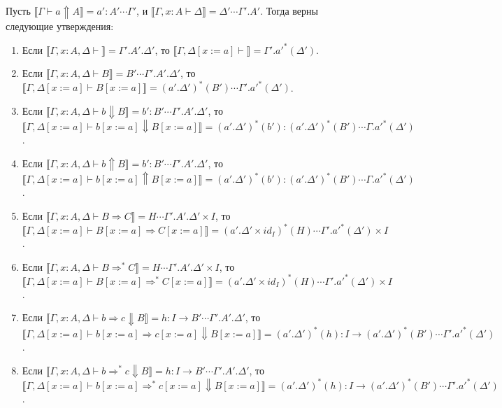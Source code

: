 \documentclass{amsart}
\theoremstyle{definition}
\theoremstyle{remark}
\newcommand{\red}{\Rightarrow}
\renewcommand{\ll}{\llbracket}
\newcommand{\rr}{\rrbracket}
\numberwithin{figure}{section}
\begin{document}
\begin{lem}
Пусть $\ll \Gamma \vdash a \Uparrow A \rr = a' : A' \dotsb \Gamma'$, и $\ll \Gamma, x : A \vdash \Delta \rr = \Delta' \dotsb \Gamma'.A'$.
Тогда верны следующие утверждения:
\begin{enumerate}
\item Если $\ll \Gamma, x : A, \Delta \vdash \rr = \Gamma'.A'.\Delta'$, то $\ll \Gamma, \Delta[x := a] \vdash \rr = \Gamma'.a'^*(\Delta')$.
\item Если $\ll \Gamma, x : A, \Delta \vdash B \rr = B' \dotsb \Gamma'.A'.\Delta'$, то $\ll \Gamma, \Delta[x := a] \vdash B[x := a] \rr = (a'.\Delta')^*(B') \dotsb \Gamma'.a'^*(\Delta')$.
\item Если $\ll \Gamma, x : A, \Delta \vdash b \Downarrow B \rr = b' : B' \dotsb \Gamma'.A'.\Delta'$, то $\ll \Gamma, \Delta[x := a] \vdash b[x := a] \Downarrow B[x := a] \rr = (a'.\Delta')^*(b') : (a'.\Delta')^*(B') \dotsb \Gamma.a'^*(\Delta')$.
\item Если $\ll \Gamma, x : A, \Delta \vdash b \Uparrow B \rr = b' : B' \dotsb \Gamma'.A'.\Delta'$, то $\ll \Gamma, \Delta[x := a] \vdash b[x := a] \Uparrow B[x := a] \rr = (a'.\Delta')^*(b') : (a'.\Delta')^*(B') \dotsb \Gamma.a'^*(\Delta')$.
\item Если $\ll \Gamma, x : A, \Delta \vdash B \red C \rr = H \dotsb \Gamma'.A'.\Delta' \times I$, то $\ll \Gamma, \Delta[x := a] \vdash B[x := a] \red C[x := a] \rr = (a'.\Delta' \times id_I)^*(H) \dotsb \Gamma'.a'^*(\Delta') \times I$.
\item Если $\ll \Gamma, x : A, \Delta \vdash B \red^* C \rr = H \dotsb \Gamma'.A'.\Delta' \times I$, то $\ll \Gamma, \Delta[x := a] \vdash B[x := a] \red^* C[x := a] \rr = (a'.\Delta' \times id_I)^*(H) \dotsb \Gamma'.a'^*(\Delta') \times I$.
\item Если $\ll \Gamma, x : A, \Delta \vdash b \red c \Downarrow B \rr = h : I \to B' \dotsb \Gamma'.A'.\Delta'$, то $\ll \Gamma, \Delta[x := a] \vdash b[x := a] \red c[x := a] \Downarrow B[x := a] \rr = (a'.\Delta')^*(h) : I \to (a'.\Delta')^*(B') \dotsb \Gamma'.a'^*(\Delta')$.
\item Если $\ll \Gamma, x : A, \Delta \vdash b \red^* c \Downarrow B \rr = h : I \to B' \dotsb \Gamma'.A'.\Delta'$, то $\ll \Gamma, \Delta[x := a] \vdash b[x := a] \red^* c[x := a] \Downarrow B[x := a] \rr = (a'.\Delta')^*(h) : I \to (a'.\Delta')^*(B') \dotsb \Gamma'.a'^*(\Delta')$.
\end{enumerate}
\end{lem}
\end{document}
